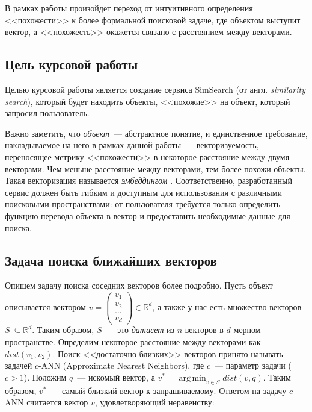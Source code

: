 \documentclass[a4paper,12pt]{extarticle}
\DeclareMathOperator*{\argmin}{arg\,min}
\begin{document}
В рамках работы произойдет переход от интуитивного определения <<похожести>> к более формальной поисковой задаче, где объектом выступит вектор, а <<похожесть>> окажется связано с расстоянием между векторами.

\subsection{Цель курсовой работы}

Целью курсовой работы является создание сервиса SimSearch (от англ. \textit{similarity search}), который будет находить объекты, <<похожие>> на объект, который запросил пользователь.

Важно заметить, что \textit{объект}~--- абстрактное понятие, и единственное требование, накладываемое на него в рамках данной работы~--- векторизуемость, переносящее метрику <<похожести>> в некоторое расстояние между двумя векторами. Чем меньше расстояние между векторами, тем более похожи объекты. Такая векторизация называется \textit{эмбеддингом} \cite{embedding}. Соответственно, разработанный сервис должен быть гибким и доступным для использования с различными поисковыми пространствами: от пользователя требуется только определить функцию перевода объекта в вектор и предоставить необходимые данные для поиска.

\subsection{Задача поиска ближайших векторов}

Опишем задачу поиска соседних векторов более подробно. Пусть объект описывается вектором $v = \begin{pmatrix}v_1 \\ v_2 \\ \ldots \\ v_d\end{pmatrix} \in \mathbb{R}^d$, а также у нас есть множество векторов $S~\subseteq \mathbb{R}^d$. Таким образом, $S$~--- это \textit{датасет} из $n$ векторов в $d$-мерном пространстве. Определим некоторое расстояние между векторами как $dist(v_1, v_2)$. Поиск <<достаточно близких>> векторов принято называть задачей $c$-ANN (Approximate Nearest Neighbors), где $c$~--- параметр задачи ($c > 1$). Положим $q$~--- искомый вектор, а $v^* = \displaystyle \argmin_{v \in S} dist(v, q)$. Таким образом, $v^*$~--- самый близкий вектор к запрашиваемому. Ответом на задачу $c$-ANN считается вектор $v$, удовлетворяющий неравенству:
\end{document}
